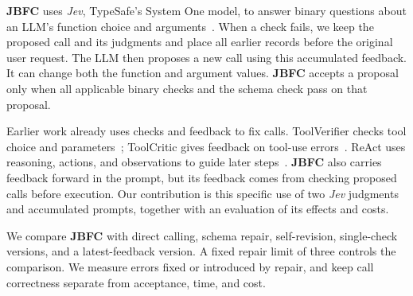 \documentclass[10pt,twocolumn,letterpaper]{article}
\begin{document}
\textbf{JBFC} uses \textit{Jev}, TypeSafe's System One model, to answer binary questions about an LLM's function choice and arguments~\cite{typesafe2026models}. When a check fails, we keep the proposed call and its judgments and place all earlier records before the original user request. The LLM then proposes a new call using this accumulated feedback. It can change both the function and argument values. \textbf{JBFC} accepts a proposal only when all applicable binary checks and the schema check pass on that proposal.

Earlier work already uses checks and feedback to fix calls. ToolVerifier checks tool choice and parameters~\cite{mekala2024toolverifier}; ToolCritic gives feedback on tool-use errors~\cite{hamad2025toolcritic}. ReAct uses reasoning, actions, and observations to guide later steps~\cite{yao2023react}. \textbf{JBFC} also carries feedback forward in the prompt, but its feedback comes from checking proposed calls before execution. Our contribution is this specific use of two \textit{Jev} judgments and accumulated prompts, together with an evaluation of its effects and costs.

We compare \textbf{JBFC} with direct calling, schema repair, self-revision, single-check versions, and a latest-feedback version. A fixed repair limit of three controls the comparison. We measure errors fixed or introduced by repair, and keep call correctness separate from acceptance, time, and cost.
\end{document}
